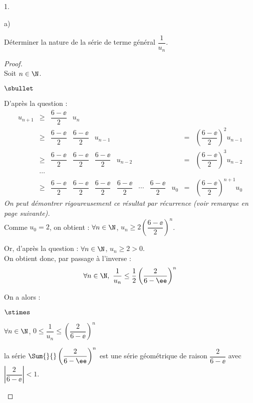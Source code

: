 \documentclass[11pt]{article}%
\begin{document}
\begin{noliste}{1.}
\begin{noliste}{a)}
    \newpage
	

  \item Déterminer la nature de la série de terme général
    $\dfrac{1}{u_n}$.
	
    \begin{proof}~\\
      Soit $n\in\N$.
      \begin{noliste}{$\sbullet$}
      \item D'après la question  :
        \[
        \begin{array}{rclllllllll}
          u_{n+1} & \geq & \dfrac{6-\ee}{2} & u_n
          \\[.4cm]
          & \geq & \dfrac{6-\ee}{2} & \dfrac{6-\ee}{2}
          &  u_{n-1} & & & &
          & = & \left(\dfrac{6-\ee}{2}\right)^2 u_{n-1}
          \\[.4cm]
          & \geq & \dfrac{6-\ee}{2} & \dfrac{6-\ee}{2} & 
          \dfrac{6-\ee}{2} & u_{n-2} & & &
          & = & \left(\dfrac{6-\ee}{2}\right)^3 u_{n-2}
          \\[.4cm]
          & \cdots & 
          \\[.2cm]
          & \geq & \dfrac{6-\ee}{2} & \dfrac{6-\ee}{2} &
          \dfrac{6-\ee}{2} & \dfrac{6-\ee}{2} & \cdots 
          & \dfrac{6-\ee}{2} & u_0 
          & = & \left(\dfrac{6-\ee}{2}\right)^{n+1} u_0
        \end{array}
        \]
        {\it On peut démontrer rigoureusement ce résultat par
          récurrence (voir remarque en page suivante).  }\\
        Comme $u_0=2$, on obtient : $\forall n\in\N$, $u_n \geq 2
        \left(\dfrac{6-\ee}{2}\right)^n$.
      \item Or, d'après la question  : $\forall n\in\N$,
        $u_n\geq 2 >0$.\\
        On obtient donc, par passage à l'inverse :
        \[
        \forall n \in \N, \ \dfrac{1}{u_n} \leq \dfrac{1}{2}
        \left(\dfrac{2}{6-\ee}\right)^n
        \]
      \item On a alors :
        \begin{noliste}{$\stimes$}
        \item $\forall n \in \N$, $0\leq \dfrac{1}{u_n} \leq
          \left(\dfrac{2}{6-\ee}\right)^n$
        \item la série $\Sum{}{} \left(\dfrac{2}{6-\ee}\right)^n$ est
          une série géométrique de raison $\dfrac{2}{6-\ee}$ avec
          $\left\vert
            \dfrac{2}{6-\ee} \right\vert <1$.\\[.2cm]

\end{noliste}
\end{noliste}
\end{proof}
\end{noliste}
\end{noliste}
\end{document}
